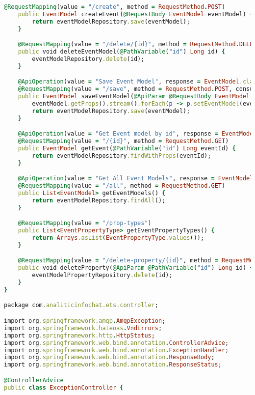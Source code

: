 \begin{lstlisting}[language=Ruby, style=rubystyle]
    @RequestMapping(value = "/create", method = RequestMethod.POST)
    public EventModel createEvent(@RequestBody EventModel eventModel) {
        return eventModelRepository.save(eventModel);
    }

    @RequestMapping(value = "/delete/{id}", method = RequestMethod.DELETE)
    public void deleteEventModel(@PathVariable("id") Long id) {
        eventModelRepository.delete(id);
    }

    @ApiOperation(value = "Save Event Model", response = EventModel.class)
    @RequestMapping(value = "/save", method = RequestMethod.POST, consumes = { MediaType.APPLICATION_JSON_VALUE })
    public EventModel saveEventModel(@ApiParam @RequestBody EventModel eventModel) {
        eventModel.getProps().stream().forEach(p -> p.setEventModel(eventModel));
        return eventModelRepository.save(eventModel);
    }

    @ApiOperation(value = "Get Event model by id", response = EventModel.class)
    @RequestMapping(value = "/{id}", method = RequestMethod.GET)
    public EventModel getEvent(@PathVariable("id") Long eventId) {
        return eventModelRepository.findWithProps(eventId);
    }

    @ApiOperation(value = "Get All Event Models", response = EventModel.class, responseContainer = "List")
    @RequestMapping(value = "/all", method = RequestMethod.GET)
    public List<EventModel> getEventModels() {
        return eventModelRepository.findAll();
    }

    @RequestMapping(value = "/prop-types")
    public List<EventPropertyType> getEventPropertyTypes() {
        return Arrays.asList(EventPropertyType.values());
    }

    @RequestMapping(value = "/delete-property/{id}", method = RequestMethod.DELETE)
    public void deleteProperty(@ApiParam @PathVariable("id") Long id) {
        eventModelPropertyRepository.delete(id);
    }
}

package com.analiticinfochat.ets.controller;

import org.springframework.amqp.AmqpException;
import org.springframework.hateoas.VndErrors;
import org.springframework.http.HttpStatus;
import org.springframework.web.bind.annotation.ControllerAdvice;
import org.springframework.web.bind.annotation.ExceptionHandler;
import org.springframework.web.bind.annotation.ResponseBody;
import org.springframework.web.bind.annotation.ResponseStatus;

@ControllerAdvice
public class ExceptionController {


\end{lstlisting}
